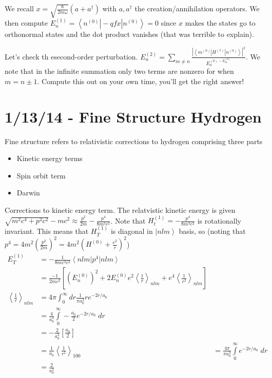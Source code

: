 \documentclass[10pt]{report}
\newcommand{\bra}[1]{\left<#1\right|}
\newcommand{\ket}[1]{\left|#1\right>}
\newcommand{\abs}[1]{\left|#1\right|}
\newcommand{\expvalue}[1]{\left<#1\right>}
\begin{document}
We recall $x = \sqrt{\frac{\hbar}{2m\omega}}\left( a+a^\dagger \right)$ with $a,a^\dagger$ the creation/annihilation operators. We then compute $E_n^{(1)} = \bra{n^{(0)}}-qfx\ket{n^{(0)}} = 0$ since $x$ makes the states go to orthonormal states and the dot product vanishes (that was terrible to explain).

Let's check th esecond-order perturbation. $E_n^{(2)} = \sum_{m \neq n} \frac{\abs{\bra{m^{(0)}}H^{(1)}\ket{n^{(0)}}}^2}{E_n^{(0) - E_m^{(0)}}}$. We note that in the infinite summation only two terms are nonzero for when $m = n \pm 1$. Compute this out on your own time, you'll get the right answer!
\chapter{1/13/14 - Fine Structure Hydrogen}

Fine structure refers to relativistic corrections to hydrogen comprising three parts
\begin{itemize}
    \item Kinetic energy terms
    \item Spin orbit term
    \item Darwin
\end{itemize}

Corrections to kinetic energy term. The relatvistic kinetic energy is given $\sqrt{m^2c^4 + p^2c^2} -mc^2 \approx \frac{p^2}{2m} - \frac{p^4}{8m^3c^2}$. Note that $H_t^{(1)} = -\frac{p^4}{8m^3c^2}$ is rotationally invariant. This means that $H_T^{(1)}$ is diagonal in $\ket{nlm}$ basis, so (noting that $p^4 = 4m^2\left( \frac{p^2}{2m} \right)^2 = 4m^2\left( H^{(0)} + \frac{e^2}{r} \right)^2$)
\begin{align}
    E_T^{(1)} &= -\frac{1}{8mc^3c^2}\bra{nlm}p^4\ket{nlm}\\
    &= \frac{-1}{2mc^2}\left[ (E_n^{(0)})^2 + 2E_n^{(0)}e^2\expvalue{\frac{1}{r}}_{nlm} + e^4\expvalue{\frac{1}{r^2}}_{nlm} \right]\\
    \expvalue{\frac{1}{r}}_{nlm} &= 4\pi\int_0^\infty dr \frac{1}{\pi a_0^3}re^{-2r/a_0}\\
    &= \frac{4}{a_0^3}\displaystyle\int\limits_{0}^{\infty}-\frac{a_0}{2}e^{-2r/a_0}\;dr\\
    &= -\frac{2}{a_0^2}\left[ \frac{a_0}{2} \right]\\
    &= \frac{1}{a_0}
    \expvalue{\frac{1}{r^2}}_{100} &= \frac{4\pi}{\pi a_0^3}\displaystyle\int\limits_{0}^{\infty}e^{-2r/a_0}\;dr\\
    &= \frac{2}{a_0^2}
\end{align}
\end{document}
